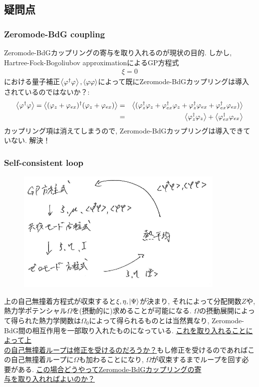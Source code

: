 \documentclass[10.5pt,a4paper]{jreport}
\newcommand{\ul}[1]{\underline{#1}}
\begin{document}
\subsection{疑問点}
\subsubsection{Zeromode-BdG coupling}
Zeromode-BdGカップリングの寄与を取り入れるのが現状の目的. しかし, Hartree-Fock-Bogoliubov approximationによるGP方程式
\begin{eqnarray}
  [h_0 -\mu + g(\xi^2 + 2\ev{\varphi^\dagger\varphi} + \ev{\varphi\varphi})]\xi = 0
\end{eqnarray}
における量子補正$\ev{\varphi^\dagger\varphi}, \ev{\varphi\varphi}$によって既にZeromode-BdGカップリングは導入されているのではないか？:
\begin{eqnarray}
\nonumber  \ev{\varphi^\dagger\varphi} = \ev{(\varphi_z + \varphi_{ex})^\dagger(\varphi_z + \varphi_{ex})} &=& \ev{(\varphi^\dagger_z\varphi_z + \varphi^\dagger_{ex}\varphi_z  + \varphi^\dagger_z\varphi_{ex} + \varphi^\dagger_{ex}\varphi_{ex})}\\
  &=& \ev{\varphi^\dagger_z\varphi_z} + \ev{\varphi^\dagger_{ex}\varphi_{ex}}
\end{eqnarray}
カップリング項は消えてしまうので, Zeromode-BdGカップリングは導入できていない. 解決！
\newpage
\subsubsection{Self-consistent loop}
\begin{figure}[htbp]
\begin{center}
  \includegraphics[width = 10cm]{./EPS/self-consistent.eps}
\end{center}
\label{self-consistent}
\end{figure}
上の自己無撞着方程式が収束すると$\xi, \eta, \ket{\Psi}$が決まり, それによって分配関数$Z$や, 熱力学ポテンシャル$\Omega$を(摂動的に)求めることが可能になる. $\Omega$の摂動展開によって得られた熱力学関数は$\Omega_0$によって得られるものとは当然異なり, Zeromode-BdG間の相互作用を一部取り入れたものになっている. \ul{これを取り入れることによって上}\\\ul{の自己無撞着ループは修正を受けるのだろうか？}もし修正を受けるのであればこの自己無撞着ループに$\Omega$も加わることになり, $\Omega$が収束するまでループを回す必要がある. \ul{この場合どうやってZeromode-BdGカップリングの寄}\\\ul{与を取り入れればよいのか？}
\end{document}
